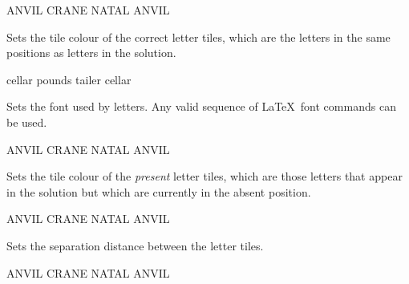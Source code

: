 \documentclass[svgnames]{report}
\begin{document}
  \begin{example}
    \begin{wordle}[border=red]{ANVIL}
      CRANE
      NATAL
      ANVIL
    \end{wordle}
  \end{example}


  Sets the tile colour of the correct  letter tiles,
  which are the letters in the same positions as letters in the solution.

  \begin{example}
    \begin{wordle}[correct=LightSkyBlue]{cellar}
      pounds
      tailer
      cellar
    \end{wordle}
  \end{example}


  Sets the font used by  letters. Any valid sequence of
  \LaTeX\ font commands can be used.

  \begin{example}
    \begin{wordle}[font=\large\sffamily]{ANVIL}
      CRANE
      NATAL
      ANVIL
    \end{wordle}
  \end{example}


  Sets the tile colour of the \textit{present}  letter tiles,
  which are those letters that appear in the solution but which are
  currently in the absent position.

  \begin{example}
    \begin{wordle}[present=Orange]{ANVIL}
      CRANE
      NATAL
      ANVIL
    \end{wordle}
  \end{example}


  Sets the separation distance between the  letter
  tiles.

  \begin{example}
    \begin{wordle}[separation=2mm]{ANVIL}
      CRANE
      NATAL
      ANVIL
    \end{wordle}
  \end{example}
\end{document}
